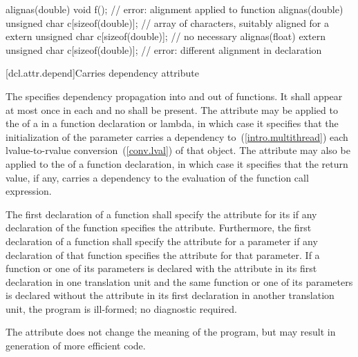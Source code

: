 \pnum
\begin{example}
\begin{codeblock}
alignas(double) void f();                         // error: alignment applied to function
alignas(double) unsigned char c[sizeof(double)];  // array of characters, suitably aligned for a 
extern unsigned char c[sizeof(double)];           // no  necessary
alignas(float)
  extern unsigned char c[sizeof(double)];         // error: different alignment in declaration
\end{codeblock}
\end{example}

[dcl.attr.depend]{Carries dependency attribute}%

\pnum
The   specifies
dependency propagation into and out of functions. It shall appear at most once
in each  and no
 shall be present. The attribute may be
applied to the  of a
 in a function declaration or lambda, in
which case it specifies that the initialization of the parameter carries a
dependency to~(\ref{intro.multithread}) each lvalue-to-rvalue
conversion~(\ref{conv.lval}) of that object. The attribute may also be applied
to the  of a function declaration, in which case it
specifies that the return value, if any, carries a dependency to the evaluation
of the function call expression.

\pnum
The first declaration of a function shall specify the  attribute for its
 if any declaration of the function specifies the
 attribute. Furthermore, the first declaration of a function shall specify
the  attribute for a parameter if any declaration of that function
specifies the  attribute for that parameter. If a function or one of its
parameters is declared with the  attribute in its first declaration in one
translation unit and the same function or one of its parameters is declared without the
 attribute in its first declaration in another translation unit, the
program is ill-formed; no diagnostic required.

\pnum
\begin{note} The  attribute does not change the meaning of the
program, but may result in generation of more efficient code. \end{note}

